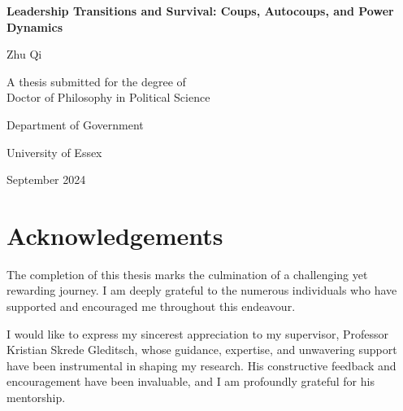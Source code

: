 \documentclass[
  12pt,
]{report}
\author{}
\date{}
\renewcommand*\contentsname{Table of contents}
\newcommand\contentsname{Table of contents}
\begin{document}
\begin{titlepage}
  \begin{center}
    \vspace*{2cm}
    
    \Huge{\textbf{Leadership Transitions and Survival: Coups, Autocoups, and Power Dynamics}}
    
    \vspace{1.5cm}
    
    \Large{Zhu Qi}
    
    \vspace{5cm}
    
    \large{A thesis submitted for the degree of \\ Doctor of Philosophy in Political Science}
    
    \vspace{0.8cm}
    
    \large{Department of Government}
    \vspace{0.5cm}
    
    \large{University of Essex}
    
    \vspace{1.5cm}
    
    \large{September 2024}
    \vspace{2cm}
    
    
  \end{center}
\end{titlepage}

\renewcommand*\contentsname{Contents}
{
\hypersetup{linkcolor=}
\setcounter{tocdepth}{2}
\tableofcontents
}
\listoffigures
\listoftables

\chapter*{Acknowledgements}\label{acknowledgements}

The completion of this thesis marks the culmination of a challenging yet
rewarding journey. I am deeply grateful to the numerous individuals who
have supported and encouraged me throughout this endeavour.

I would like to express my sincerest appreciation to my supervisor,
Professor Kristian Skrede Gleditsch, whose guidance, expertise, and
unwavering support have been instrumental in shaping my research. His
constructive feedback and encouragement have been invaluable, and I am
profoundly grateful for his mentorship.
\end{document}
